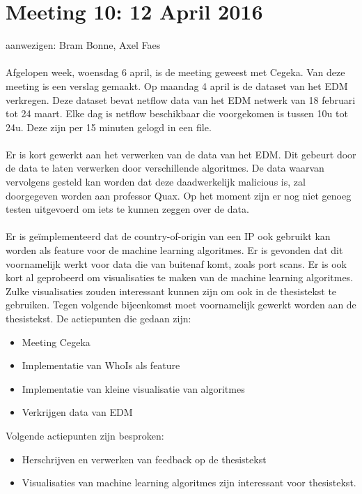 \section{Meeting 10: 12 April 2016}
aanwezigen: Bram Bonne, Axel Faes\\\\
Afgelopen week, woensdag 6 april, is de meeting geweest met Cegeka. Van deze meeting is een verslag gemaakt. Op maandag 4 april is de dataset van het EDM verkregen. Deze dataset bevat netflow data van het EDM netwerk van 18 februari tot 24 maart. Elke dag is netflow beschikbaar die voorgekomen is tussen 10u tot 24u. Deze zijn per 15 minuten gelogd in een file. \\\\
Er is kort gewerkt aan het verwerken van de data van het EDM. Dit gebeurt door de data te laten verwerken door verschillende algoritmes. De data waarvan vervolgens gesteld kan worden dat deze daadwerkelijk malicious is, zal doorgegeven worden aan professor Quax. Op het moment zijn er nog niet genoeg testen uitgevoerd om iets te kunnen zeggen over de data. \\\\
Er is ge\"implementeerd dat de country-of-origin van een IP ook gebruikt kan worden als feature voor de machine learning algoritmes. Er is gevonden dat dit voornamelijk werkt voor data die van buitenaf komt, zoals port scans. Er is ook kort al geprobeerd om visualisaties te maken van de machine learning algoritmes. Zulke visualisaties zouden interessant kunnen zijn om ook in de thesistekst te gebruiken. Tegen volgende bijeenkomst moet voornamelijk gewerkt worden aan de thesistekst.
De actiepunten die gedaan zijn:
\begin{itemize}  
		\item Meeting Cegeka
        \item Implementatie van WhoIs als feature
        \item Implementatie van kleine visualisatie van algoritmes
        \item  Verkrijgen data van EDM
\end{itemize}

Volgende actiepunten zijn besproken:
\begin{itemize}  		
		\item Herschrijven en verwerken van feedback op de thesistekst
        \item Visualisaties van machine learning algoritmes zijn interessant voor thesistekst.
\end{itemize}
